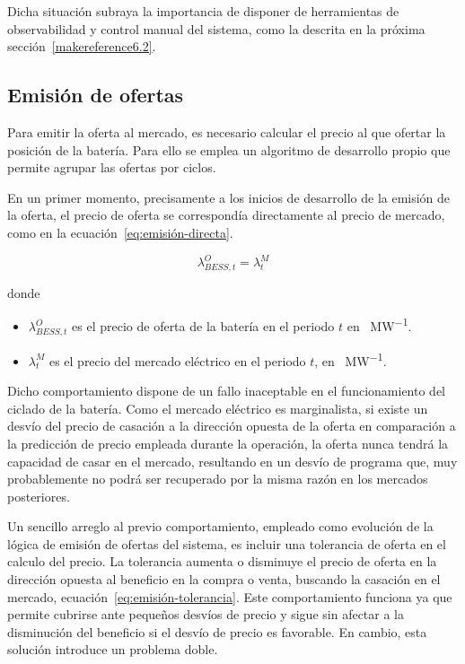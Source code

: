 Dicha situación subraya la importancia de disponer de herramientas de observabilidad y control manual del sistema, como la descrita en la próxima sección~\ref{makereference6.2}.

\subsection{Emisión de ofertas}
\label{makereference6.1.2}

Para emitir la oferta al mercado, es necesario calcular el precio al que ofertar la posición de la batería. Para ello se emplea un algoritmo de desarrollo propio que permite agrupar las ofertas por ciclos.

En un primer momento, precisamente a los inicios de desarrollo de la emisión de la oferta, el precio de oferta se correspondía directamente al precio de mercado, como en la ecuación~\ref{eq:emisión-directa}.

\begin{equation}
  \label{eq:emisión-directa}
  \lambda^{O}_{BESS, t} = \lambda^{M}_{t}
\end{equation}

donde

\begin{itemize}

  \item \( \lambda^{O}_{BESS, t} \) es el precio de oferta de la batería en el periodo \( t \) en \si{\text{\euro}\per\mega\watt}.

  \item \( \lambda^{M}_{t} \) es el precio del mercado eléctrico en el periodo \( t \), en \si{\text{\euro}\per\mega\watt}.

\end{itemize}

Dicho comportamiento dispone de un fallo inaceptable en el funcionamiento del ciclado de la batería. Como el mercado eléctrico es marginalista, si existe un desvío del precio de casación a la dirección opuesta de la oferta en comparación a la predicción de precio empleada durante la operación, la oferta nunca tendrá la capacidad de casar en el mercado, resultando en un desvío de programa que, muy probablemente no podrá ser recuperado por la misma razón en los mercados posteriores.

Un sencillo arreglo al previo comportamiento, empleado como evolución de la lógica de emisión de ofertas del sistema, es incluir una tolerancia de oferta en el calculo del precio. La tolerancia aumenta o disminuye el precio de oferta en la dirección opuesta al beneficio en la compra o venta, buscando la casación en el mercado, ecuación~\ref{eq:emisión-tolerancia}. Este comportamiento funciona ya que permite cubrirse ante pequeños desvíos de precio y sigue sin afectar a la disminución del beneficio si el desvío de precio es favorable. En cambio, esta solución introduce un problema doble.

